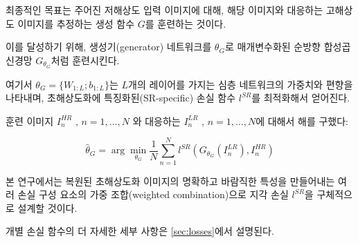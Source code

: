 \documentclass[10pt,twocolumn,letterpaper]{article}
\newcommand{\kor}[1]{#1}
\newcommand{\eng}[1]{}
\begin{document}
\eng{
Our ultimate goal is to train a generating function $G$ that estimates for a given \ac{LR} input image its corresponding \ac{HR} counterpart.
}\kor{
최종적인 목표는 주어진 \ac{저해상도} 입력 이미지에 대해, 해당 이미지와 대응하는 \ac{고해상도} 이미지를 추정하는 생성 함수 $G$를 훈련하는 것이다.
} \eng{
To achieve this, we train a generator network as a feed-forward \ac{CNN} $G_{\theta_G}$ parametrized by ${\theta_G}$.
}\kor{
이를 달성하기 위해, 생성기(generator) 네트워크를  ${\theta_G}$로 매개변수화된 순방향 \ac{합성곱 신경망} $G_{\theta_G}$처럼 훈련시킨다.
} \eng{
Here ${\theta_G}=\{W_{1:L}; b_{1:L}\}$ denotes the weights and biases of a $L$-layer deep network and is obtained by optimizing a SR-specific loss function $l^{SR}$.
}\kor{
여기서 ${\theta_G}=\{W_{1:L}; b_{1:L}\}$는 $L$개의 레이어를 가지는 심층 네트워크의 가중치와 편향을 나타내며, 초해상도화에 특징화된(SR-specific) 손실 함수 $l^{SR}$를 최적화해서 얻어진다.
} \eng{
For training images $I^{HR}_n$ , $n = 1,\dots,N$ with corresponding $I^{LR}_n$ , $n = 1,\dots,N$, we solve:
}\kor{
훈련 이미지 $I^{HR}_n$ , $n = 1,\dots,N$ 와 대응하는 $I^{LR}_n$ , $n = 1,\dots,N$에 대해서 해를 구했다:
}
\begin{equation}
\hat{{\theta}}_G = \arg\min_{\theta_G} \frac{1}{N} \sum_{n=1}^{N}{l^{SR}(G_{\theta_G}(I^{LR}_n),I^{HR}_n)}
\end{equation}
\eng{
In this work we will specifically design a perceptual loss $l^{SR}$ as a weighted combination of several loss components that model distinct desirable characteristics of the recovered \ac{SR} image.
}\kor{
본 연구에서는 복원된 \ac{초해상도화} 이미지의 명확하고 바람직한 특성을 만들어내는 여러 손실 구성 요소의 가중 조합(weighted combination)으로 지각 손실 $l^{SR}$을 구체적으로 설계할 것이다.
} \eng{
The individual loss functions are described in more detail in Section \ref{sec:losses}.
}\kor{
개별 손실 함수의 더 자세한 세부 사항은 \ref{sec:losses}에서 설명된다.
}
\end{document}
